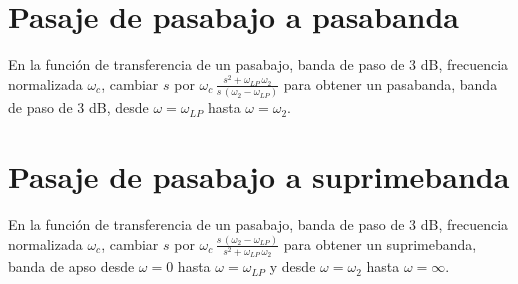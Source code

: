 \section{Pasaje de pasabajo a pasabanda}

En la funci\'{o}n de transferencia de un pasabajo, banda de paso de 3
dB, frecuencia normalizada $\omega_{c}$, cambiar $s$ por 
$\omega_{c} \, \frac{s^{2} + \omega_{LP} \, \omega_{2}}{s \, \left(
    \omega_{2} - \omega_{LP}\right)}$ 
para obtener un pasabanda, banda de paso de 3 dB, desde $\omega =
\omega_{LP}$ hasta $\omega = \omega_{2}$.


\section{Pasaje de pasabajo a suprimebanda}

En la funci\'{o}n de transferencia de un pasabajo, banda de paso de 3
dB, frecuencia normalizada $\omega_{c}$, cambiar $s$ por 
$\omega_{c} \, \frac{s \, \left(\omega_{2} - \omega_{LP}\right)}
{s^{2} + \omega_{LP} \, \omega_{2}}$
para obtener un suprimebanda, banda de apso desde $\omega = 0$ hasta
$\omega = \omega_{LP}$ y desde $\omega = \omega_{2}$ hasta $\omega =
\infty$.

